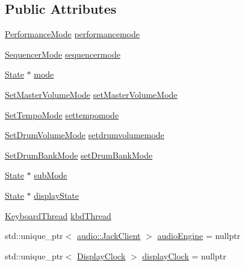 \subsection*{Public Attributes}
\begin{DoxyCompactItemize}
\item 
\hyperlink{classdrumpi_1_1PerformanceMode}{Performance\+Mode} \hyperlink{classdrumpi_1_1Application_aa487db770d15b0fd9058954fdbe6389b}{performancemode}
\item 
\hyperlink{classdrumpi_1_1SequencerMode}{Sequencer\+Mode} \hyperlink{classdrumpi_1_1Application_a0e63d5d44014bd4bed1cdfd10f88bbf3}{sequencermode}
\item 
\hyperlink{classdrumpi_1_1State}{State} $\ast$ \hyperlink{classdrumpi_1_1Application_a12010a4072b841383566235a9ee4c20d}{mode}
\item 
\hyperlink{classdrumpi_1_1SetMasterVolumeMode}{Set\+Master\+Volume\+Mode} \hyperlink{classdrumpi_1_1Application_a9a6dfaebc7929553d6b1b5ed9407be11}{set\+Master\+Volume\+Mode}
\item 
\hyperlink{classdrumpi_1_1SetTempoMode}{Set\+Tempo\+Mode} \hyperlink{classdrumpi_1_1Application_a2316f62710a89af187fe7bec9fcac5e8}{settempomode}
\item 
\hyperlink{classdrumpi_1_1SetDrumVolumeMode}{Set\+Drum\+Volume\+Mode} \hyperlink{classdrumpi_1_1Application_a6993ce12d76456caba93f453da580892}{setdrumvolumemode}
\item 
\hyperlink{classdrumpi_1_1SetDrumBankMode}{Set\+Drum\+Bank\+Mode} \hyperlink{classdrumpi_1_1Application_a92e4162f1a85a267ff7de85ebeb31f8a}{set\+Drum\+Bank\+Mode}
\item 
\hyperlink{classdrumpi_1_1State}{State} $\ast$ \hyperlink{classdrumpi_1_1Application_a8af8346be9bf3ff5b3307336d0a9a406}{sub\+Mode}
\item 
\hyperlink{classdrumpi_1_1State}{State} $\ast$ \hyperlink{classdrumpi_1_1Application_a69da7a09674251d1d54b67c7ea915066}{display\+State}
\item 
\hyperlink{classdrumpi_1_1KeyboardThread}{Keyboard\+Thread} \hyperlink{classdrumpi_1_1Application_aace4b13db8cd738d2f3650fdd792f2e0}{kbd\+Thread}
\item 
std\+::unique\+\_\+ptr$<$ \hyperlink{classdrumpi_1_1audio_1_1JackClient}{audio\+::\+Jack\+Client} $>$ \hyperlink{classdrumpi_1_1Application_a9205c148fcc133669c08e8134dd3b151}{audio\+Engine} = nullptr
\item 
std\+::unique\+\_\+ptr$<$ \hyperlink{classdrumpi_1_1DisplayClock}{Display\+Clock} $>$ \hyperlink{classdrumpi_1_1Application_afaaa7672fa3f338283cf3b2c355272b0}{display\+Clock} = nullptr

\end{DoxyCompactItemize}
